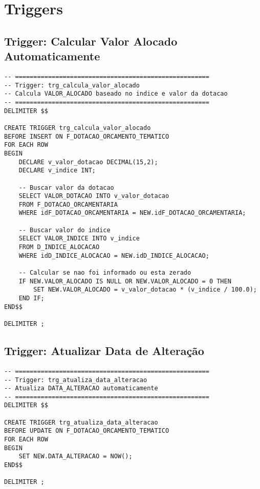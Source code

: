 \documentclass[12pt,a4paper]{article}
\begin{document}
\section{Triggers}

\subsection{Trigger: Calcular Valor Alocado Automaticamente}

\begin{lstlisting}
-- =====================================================
-- Trigger: trg_calcula_valor_alocado
-- Calcula VALOR_ALOCADO baseado no indice e valor da dotacao
-- =====================================================
DELIMITER $$

CREATE TRIGGER trg_calcula_valor_alocado
BEFORE INSERT ON F_DOTACAO_ORCAMENTO_TEMATICO
FOR EACH ROW
BEGIN
    DECLARE v_valor_dotacao DECIMAL(15,2);
    DECLARE v_indice INT;
    
    -- Buscar valor da dotacao
    SELECT VALOR_DOTACAO INTO v_valor_dotacao
    FROM F_DOTACAO_ORCAMENTARIA
    WHERE idF_DOTACAO_ORCAMENTARIA = NEW.idF_DOTACAO_ORCAMENTARIA;
    
    -- Buscar valor do indice
    SELECT VALOR_INDICE INTO v_indice
    FROM D_INDICE_ALOCACAO
    WHERE idD_INDICE_ALOCACAO = NEW.idD_INDICE_ALOCACAO;
    
    -- Calcular se nao foi informado ou esta zerado
    IF NEW.VALOR_ALOCADO IS NULL OR NEW.VALOR_ALOCADO = 0 THEN
        SET NEW.VALOR_ALOCADO = v_valor_dotacao * (v_indice / 100.0);
    END IF;
END$$

DELIMITER ;
\end{lstlisting}

\subsection{Trigger: Atualizar Data de Alteração}

\begin{lstlisting}
-- =====================================================
-- Trigger: trg_atualiza_data_alteracao
-- Atualiza DATA_ALTERACAO automaticamente
-- =====================================================
DELIMITER $$

CREATE TRIGGER trg_atualiza_data_alteracao
BEFORE UPDATE ON F_DOTACAO_ORCAMENTO_TEMATICO
FOR EACH ROW
BEGIN
    SET NEW.DATA_ALTERACAO = NOW();
END$$

DELIMITER ;
\end{lstlisting}
\end{document}
